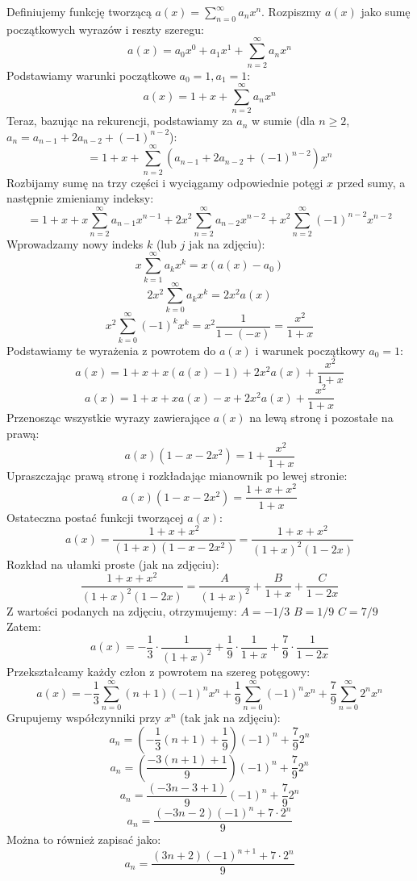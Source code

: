 \documentclass{mwart}
\begin{document}
\begin{mdframed}
    Definiujemy funkcję tworzącą $a(x) = \sum_{n=0}^{\infty} a_n x^n$.
    Rozpiszmy $a(x)$ jako sumę początkowych wyrazów i reszty szeregu:
    $$ a(x) = a_0 x^0 + a_1 x^1 + \sum_{n=2}^{\infty} a_n x^n $$
    Podstawiamy warunki początkowe $a_0 = 1, a_1 = 1$:
    $$ a(x) = 1 + x + \sum_{n=2}^{\infty} a_n x^n $$
    Teraz, bazując na rekurencji, podstawiamy za $a_n$ w sumie (dla $n \ge 2$, $a_n = a_{n-1} + 2a_{n-2} + (-1)^{n-2}$):
    $$ = 1 + x + \sum_{n=2}^{\infty} (a_{n-1} + 2a_{n-2} + (-1)^{n-2}) x^n $$
    Rozbijamy sumę na trzy części i wyciągamy odpowiednie potęgi $x$ przed sumy, a następnie zmieniamy indeksy:
    $$ = 1 + x + x \sum_{n=2}^{\infty} a_{n-1} x^{n-1} + 2x^2 \sum_{n=2}^{\infty} a_{n-2} x^{n-2} + x^2 \sum_{n=2}^{\infty} (-1)^{n-2} x^{n-2} $$
    Wprowadzamy nowy indeks $k$ (lub $j$ jak na zdjęciu):
    $$ x \sum_{k=1}^{\infty} a_k x^k = x(a(x) - a_0) $$
    $$ 2x^2 \sum_{k=0}^{\infty} a_k x^k = 2x^2 a(x) $$
    $$ x^2 \sum_{k=0}^{\infty} (-1)^k x^k = x^2 \frac{1}{1-(-x)} = \frac{x^2}{1+x} $$
    Podstawiamy te wyrażenia z powrotem do $a(x)$ i warunek początkowy $a_0=1$:
    $$ a(x) = 1 + x + x(a(x) - 1) + 2x^2 a(x) + \frac{x^2}{1+x} $$
    $$ a(x) = 1 + x + x a(x) - x + 2x^2 a(x) + \frac{x^2}{1+x} $$
    Przenosząc wszystkie wyrazy zawierające $a(x)$ na lewą stronę i pozostałe na prawą:
    $$ a(x) (1 - x - 2x^2) = 1 + \frac{x^2}{1+x} $$
    Upraszczając prawą stronę i rozkładając mianownik po lewej stronie:
    $$ a(x) (1 - x - 2x^2) = \frac{1+x+x^2}{1+x} $$
    Ostateczna postać funkcji tworzącej $a(x)$:
    $$ a(x) = \frac{1+x+x^2}{(1+x)(1 - x - 2x^2)} = \frac{1+x+x^2}{(1+x)^2 (1-2x)} $$
    Rozkład na ułamki proste (jak na zdjęciu):
    $$ \frac{1+x+x^2}{(1+x)^2 (1-2x)} = \frac{A}{(1+x)^2} + \frac{B}{1+x} + \frac{C}{1-2x} $$
    Z wartości podanych na zdjęciu, otrzymujemy:
    $A = -1/3$
    $B = 1/9$
    $C = 7/9$
    Zatem:
    $$ a(x) = -\frac{1}{3} \cdot \frac{1}{(1+x)^2} + \frac{1}{9} \cdot \frac{1}{1+x} + \frac{7}{9} \cdot \frac{1}{1-2x} $$
    Przekształcamy każdy człon z powrotem na szereg potęgowy:
    $$ a(x) = -\frac{1}{3} \sum_{n=0}^{\infty} (n+1)(-1)^n x^n + \frac{1}{9} \sum_{n=0}^{\infty} (-1)^n x^n + \frac{7}{9} \sum_{n=0}^{\infty} 2^n x^n $$
    Grupujemy współczynniki przy $x^n$ (tak jak na zdjęciu):
    $$ a_n = \left(-\frac{1}{3}(n+1) + \frac{1}{9}\right)(-1)^n + \frac{7}{9}2^n $$
    $$ a_n = \left(\frac{-3(n+1)+1}{9}\right)(-1)^n + \frac{7}{9}2^n $$
    $$ a_n = \frac{(-3n-3+1)}{9}(-1)^n + \frac{7}{9}2^n $$
    $$ a_n = \frac{(-3n-2)(-1)^n + 7 \cdot 2^n}{9} $$
    Można to również zapisać jako:
    $$ a_n = \frac{ (3n+2)(-1)^{n+1} + 7 \cdot 2^n }{9} $$
    

\end{mdframed}
\end{document}
